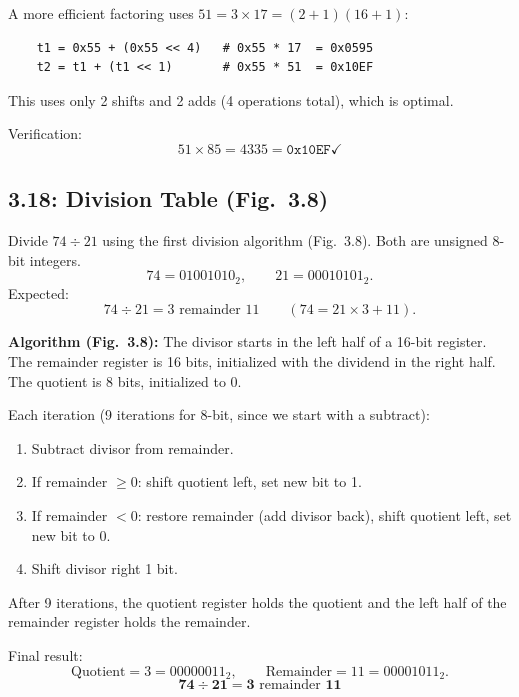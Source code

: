 A more efficient factoring uses $51 = 3 \times 17 = (2 + 1)(16 + 1)$:

\begin{verbatim}
    t1 = 0x55 + (0x55 << 4)   # 0x55 * 17  = 0x0595
    t2 = t1 + (t1 << 1)       # 0x55 * 51  = 0x10EF
\end{verbatim}

This uses only 2 shifts and 2 adds (4 operations total), which is optimal.

Verification:
\[
  51 \times 85 = 4335 = \texttt{0x10EF} \checkmark
\]

\subsection*{3.18: Division Table (Fig.~3.8)}
\hypertarget{sol-3.18}{}

Divide $74 \div 21$ using the first division algorithm (Fig.~3.8). Both are
unsigned 8-bit integers.
\[
  74 = 01001010_2, \qquad 21 = 00010101_2.
\]
Expected:
\[
  74 \div 21 = 3 \text{ remainder } 11 \qquad (74 = 21 \times 3 + 11).
\]

\medskip\noindent\textbf{Algorithm (Fig.~3.8):}
The divisor starts in the left half of a 16-bit register. The remainder register
is 16 bits, initialized with the dividend in the right half. The quotient is 8
bits, initialized to 0.

Each iteration (9 iterations for 8-bit, since we start with a subtract):
\begin{enumerate}
  \item Subtract divisor from remainder.
  \item If remainder $\ge 0$: shift quotient left, set new bit to 1.
  \item If remainder $< 0$: restore remainder (add divisor back), shift quotient
        left, set new bit to 0.
  \item Shift divisor right 1 bit.
\end{enumerate}

After 9 iterations, the quotient register holds the quotient and the left half
of the remainder register holds the remainder.

Final result:
\[
  \text{Quotient} = 3 = 00000011_2, \qquad \text{Remainder} = 11 = 00001011_2.
\]
\[
  \mathbf{74 \div 21 = 3} \text{ remainder } \mathbf{11}
\]

